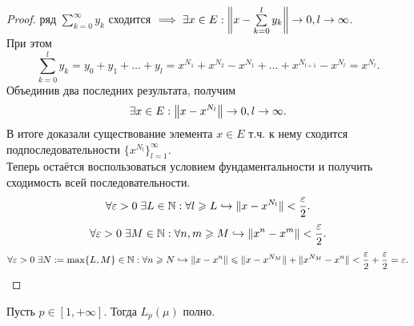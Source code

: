 \begin{proof}
		ряд $\sum\limits_{k=0}^\infty y_k$ сходится $\implies \exists x \in E: \left\|x - \sum\limits_{k=0}^l y_k\right\| \rightarrow 0, l \rightarrow \infty$.\\
		При этом \[
			\sum_{k=0}^l y_k = y_0 + y_1 + \dots + y_l = x^{N_1} + x^{N_2} - x^{N_1} + \dots + x^{N_{l+1}} - x^{N_l} = x^{N_l}.
		\]
		Объединив два последних результата, получим \[
			\exists x \in E: \left\|x - x^{N_l}\right\| \rightarrow 0, l \rightarrow \infty.
		\]
		В итоге доказали существование элемента $x \in E$ т.ч. к нему сходится подпоследовательности $\{x^{N_l}\}_{l=1}^\infty$.\\
		Теперь остаётся воспользоваться условием фундаментальности и получить сходимость всей последовательности.
		\[
			\forall \varepsilon > 0\; \exists L \in \mathbb{N}: \forall l \geqslant L \hookrightarrow \|x - x^{N_l}\| < \frac{\varepsilon}{2}.
		\]\[
			\forall \varepsilon > 0\; \exists M \in \mathbb{N}: \forall n, m \geqslant M \hookrightarrow \|x^n - x^m\| < \frac{\varepsilon}{2}.
		\]\[
			\forall \varepsilon > 0\; \exists N := \max\{L, M\} \in \mathbb{N}: \forall n \geqslant N	 \hookrightarrow \| x - x^n \| \leqslant \| x - x^{N_M}\| + \| x^{N_M} - x^n\| < \frac{\varepsilon}{2} + \frac{\varepsilon}{2} = \varepsilon.
		\]
\end{proof}
\begin{theorem}
	Пусть $p \in [1, +\infty]$. Тогда $L_p(\mu)$ полно.\\
\end{theorem}
